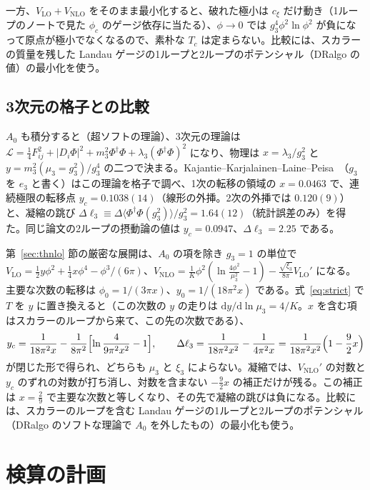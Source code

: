 \documentclass[a4paper,10pt]{ltjsarticle}
\newcommand{\dd}{\mathrm{d}}
\begin{document}
一方、$V_{\mathrm{LO}}+V_{\mathrm{NLO}}$ をそのまま最小化すると、破れた極小は $c_\xi$ だけ動き（1ループのノートで見た $\phi_c$ のゲージ依存に当たる）、$\phi\to0$ では $g_3^4\phi^2\ln\phi^2$ が負になって原点が極小でなくなるので、素朴な $T_c$ は定まらない。比較には、スカラーの質量を残した Landau ゲージの1ループと2ループのポテンシャル（DRalgo の値）の最小化を使う。

\subsection{3次元の格子との比較}\label{sec:lattice}

$A_0$ も積分すると（超ソフトの理論）、3次元の理論は $\mathcal L=\frac14F_{ij}^2+|D_i\Phi|^2+m_3^2\Phi^\dagger\Phi+\lambda_3(\Phi^\dagger\Phi)^2$ になり、物理は $x=\lambda_3/g_3^2$ と $y=m_3^2(\mu_3=g_3^2)/g_3^4$ の二つで決まる。Kajantie--Karjalainen--Laine--Peisa~\cite{kklp98}（$g_3$ を $e_3$ と書く）はこの理論を格子で調べ、1次の転移の領域の $x=0.0463$ で、連続極限の転移点 $y_c=0.1038(14)$（線形の外挿。2次の外挿では $0.120(9)$）と、凝縮の跳び $\Delta\ell_3\equiv\Delta\langle\Phi^\dagger\Phi(g_3^2)\rangle/g_3^2=1.64(12)$（統計誤差のみ）を得た。同じ論文の2ループの摂動論の値は $y_c=0.0947$、$\Delta\ell_3=2.25$ である。

第~\ref{sec:thnlo} 節の厳密な展開は、$A_0$ の項を除き $g_3=1$ の単位で $V_{\mathrm{LO}}=\frac12y\phi^2+\frac14x\phi^4-\phi^3/(6\pi)$、$V_{\mathrm{NLO}}=\frac1K\phi^2(\ln\frac{4\phi^2}{\mu_3^2}-1)-\frac{\sqrt{\xi_3}}{8\pi}V_{\mathrm{LO}}'$ になる。主要な次数の転移は $\phi_0=1/(3\pi x)$、$y_0=1/(18\pi^2x)$ である。式~\eqref{eq:strict} で $T$ を $y$ に置き換えると（この次数の $y$ の走りは $\dd y/\dd\ln\mu_3=4/K$。$x$ を含む項はスカラーのループから来て、この先の次数である）、
\begin{equation}
y_c=\frac1{18\pi^2x}-\frac1{8\pi^2}\Bigl[\ln\frac4{9\pi^2x^2}-1\Bigr],\qquad
\Delta\ell_3=\frac1{18\pi^2x^2}-\frac1{4\pi^2x}=\frac1{18\pi^2x^2}\Bigl(1-\frac92x\Bigr)
\label{eq:lat}
\end{equation}
が閉じた形で得られ、どちらも $\mu_3$ と $\xi_3$ によらない。凝縮では、$V_{\mathrm{NLO}}'$ の対数と $y_c$ のずれの対数が打ち消し、対数を含まない $-\frac92x$ の補正だけが残る。この補正は $x=\frac29$ で主要な次数と等しくなり、その先で凝縮の跳びは負になる。比較には、スカラーのループを含む Landau ゲージの1ループと2ループのポテンシャル（DRalgo のソフトな理論で $A_0$ を外したもの）の最小化も使う。

\section{検算の計画}\label{sec:plan}
\end{document}
